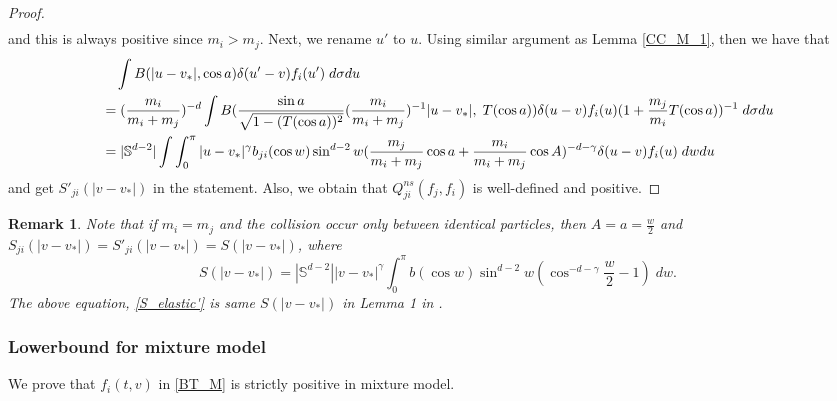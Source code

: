 \documentclass[reqno,10pt]{amsart}
\newtheorem{remark}[theorem]{Remark}
\numberwithin{equation}{section}
\begin{document}
\begin{proof}
\begin{align*}
\end{align*} and this is always positive since $m_i>m_j.$ Next, we rename $u'$ to $u$. Using similar argument as Lemma \ref{CC_M_1}, then we have that 
\begin{align} 
    &\quad \int B(|u-v_*|,\cos a) \delta(u'-v)f_i(u') \;d\sigma du \label{B_CC_M_2} \\
    &=(\frac{m_i}{m_i+m_j})^{-d}\int B(\frac{\sin a}{\sqrt{1-(T(\cos a))^2}}(\frac{m_i}{m_i+m_j})^{-1}|u-v_*|,\;T(\cos a)) \delta(u-v)f_i(u)(1+\frac{m_j}{m_i}T(\cos a))^{-1} \;d\sigma du \notag \\ 
    &=|\mathbb{S}^{d-2}|\int \int_0^\pi |u-v_*|^{\gamma}b_{ji}(\cos w)\sin^{d-2}w (\frac{m_j}{m_i+m_j}\cos a + \frac{m_i}{m_i+m_j}\cos A)^{-d-\gamma}\delta(u-v)f_i(u) \; dwdu \notag 
\end{align}
\noindent and get $S'_{ji}(|v-v_*|)$ in the statement. Also, we obtain that $Q^{ns}_{ji}(f_j,f_i)$ is well-defined and positive.
\end{proof}

\begin{remark}
Note that if $m_i=m_j$ and the collision occur only between identical particles, then $A=a=\frac{w}{2}$ and $ S_{ji}(|v-v_*|)= S'_{ji}(|v-v_*|)= S(|v-v_*|)$, where
\begin{equation} \label{S_elastic'}
      S(|v-v_*|)=|\mathbb{S}^{d-2}||v-v_*|^{\gamma}\int_0^\pi b(\cos w)\sin^{d-2}w(\cos^{-d-\gamma}\frac{w}{2}-1) \;dw.
\end{equation} The above equation, \eqref{S_elastic'} is same $S(|v-v_*|)$ in Lemma 1 in \cite{AD2000}. \\
\end{remark} 

\subsubsection{Lowerbound for mixture model} 
We prove that $f_i(t,v)$ in \eqref{BT_M} is strictly positive in mixture model. 
\end{document}
